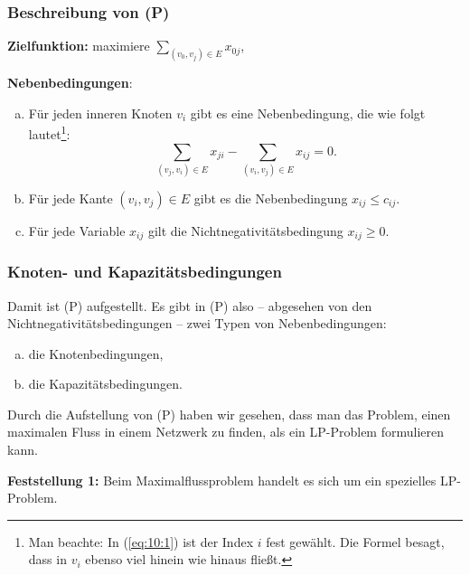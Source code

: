 \documentclass[smaller]{beamer}
\begin{document}
\begin{frame}
\frametitle{Beschreibung von (P)}
\textbf{Zielfunktion:} maximiere $\displaystyle\sum\limits_{(v_0,v_j) \in E}{x_{0j}}$, \\ \vspace*{0.2cm}

\textbf{Nebenbedingungen}:
\begin{enumerate}[a)]
\item Für jeden inneren Knoten $v_i$ gibt es eine Nebenbedingung, die wie folgt lautet\footnote{Man beachte: In (\ref{eq:10:1}) ist der Index $i$ fest gewählt. Die Formel besagt, dass in $v_i$ ebenso viel hinein wie hinaus fließt.}:
\begin{equation}
\label{eq:10:1}
\sum\limits_{(v_j,v_i) \in E}{x_{ji}} - \sum\limits_{(v_i,v_j) \in E}{x_{ij}} = 0.
\end{equation}

\item Für jede Kante $(v_i,v_j) \in E$ gibt es die Nebenbedingung $x_{ij} \leq c_{ij}$.
\item Für jede Variable $x_{ij}$ gilt die Nichtnegativitätsbedingung $x_{ij} \geq 0$.
\end{enumerate}
\end{frame}

\begin{frame}
\frametitle{Knoten- und Kapazitätsbedingungen}
Damit ist (P) aufgestellt. Es gibt in (P) also -- abgesehen von den Nichtnegativitätsbedingungen -- zwei Typen von Nebenbedingungen:
\begin{enumerate}[a)]
\item die \alert{Knotenbedingungen},
\item die \alert{Kapazitätsbedingungen}.
\end{enumerate} \vspace*{0.2cm}

Durch die Aufstellung von (P) haben wir gesehen, \alert{dass man das Problem, einen maximalen Fluss in einem Netzwerk zu finden, als ein LP-Problem formulieren kann}. \\ \vspace*{0.2cm}

\textbf{Feststellung 1:}
Beim Maximalflussproblem handelt es sich um ein spezielles LP-Problem.
\end{frame}
\end{document}
